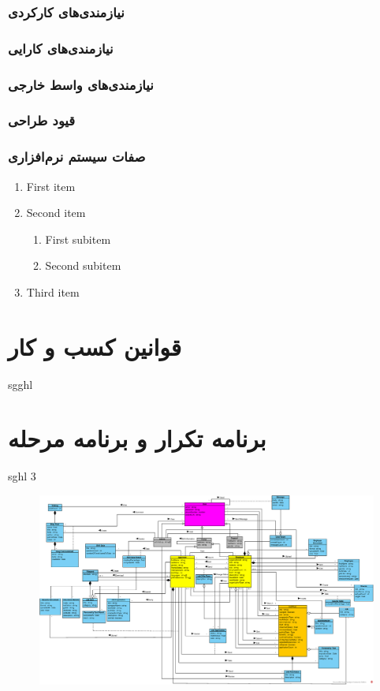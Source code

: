 \documentclass[12pt]{article}
\begin{document}
	\subsubsection{نیازمندی‌های کارکردی}
	\subsubsection{نیازمندی‌های کارایی}
	\subsubsection{نیازمندی‌های واسط خارجی}
	\subsubsection{قیود طراحی}
	\subsubsection{صفات سیستم نرم‌افزاری}

		\begin{enumerate}
			\renewcommand{\labelenumi}{R\arabic{enumi}}
			\item First item
			\item Second item
			\begin{enumerate}
			\renewcommand{\labelenumii}{R\arabic{enumi}.\arabic{enumii}}
			\item First subitem
			\item Second subitem
			\end{enumerate}
		\item Third item
	\end{enumerate}

	\section{قوانین کسب و کار}
	sgghl

	\section{برنامه تکرار و برنامه مرحله}
	sghl 3

	\begin{figure}
		\centering
		\includegraphics[width=1.5\linewidth]{files/Project_OOAD_Phase2_DiagramClass_V5_EnglishVersion}
		\caption{}
		\label{fig:projectooadphase2diagramclassv5englishversion}
	\end{figure}
\end{document}
